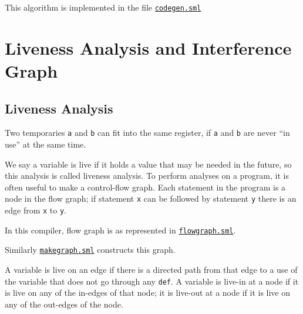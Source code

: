 This algorithm is implemented in the file
\href{https://www.github.com/sourabh2311/btp/tree/master/Compiler/codegen.sml}{\texttt{codegen.sml}}

\section{Liveness Analysis and Interference Graph}


\hypertarget{liveness-analysis}{%
	\subsection{Liveness Analysis}\label{liveness-analysis}}

Two temporaries
\texttt{a} and
\texttt{b} can
fit into the same register, if
\texttt{a} and
\texttt{b} are
never ``in use'' at the same time.

We say a variable is live if it holds a value that may be needed in the
future, so this analysis is called liveness analysis. To perform
analyses on a program, it is often useful to make a control-flow graph.
Each statement in the program is a node in the flow graph; if statement
\texttt{x} can
be followed by statement
\texttt{y} there
is an edge from
\texttt{x} to
\texttt{y}.

In this compiler, flow graph is as represented in
\href{https://www.github.com/sourabh2311/btp/tree/master/Compiler/flowgraph.sml}{\texttt{flowgraph.sml}}.

Similarly
\href{https://www.github.com/sourabh2311/btp/tree/master/Compiler/flowgraph.sml}{\texttt{makegraph.sml}}
constructs this graph.

A variable is live on an edge if there is a directed path from that edge
to a use of the variable that does not go through any
\texttt{def}. A
variable is live-in at a node if it is live on any of the in-edges of
that node; it is live-out at a node if it is live on any of the
out-edges of the node.

